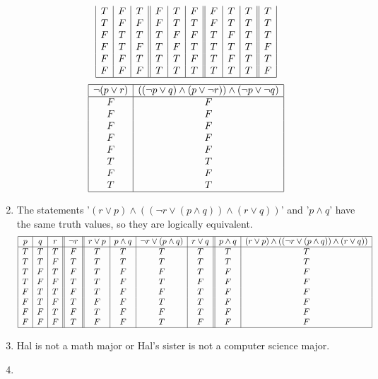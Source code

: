 \documentclass{article}
\begin{document}
\begin{enumerate}[label=\textbf{\arabic*.}]
\[\begin{array}{|c|c|c||c|c|c||c|c|c||c|c||c|}
T & F & T & F & T & F & F & T & T & T \\
T & F & F & F & T & T & F & T & T & T \\
F & T & T & T & F & F & T & F & T & T \\
F & T & F & T & F & T & T & T & T & F \\
F & F & T & T & T & F & T & F & T & T \\
F & F & F & T & T & T & T & T & T & F \\
\hline 
\end{array}
\]
\[
\begin{array}{|c|c|}
\hline
\neg (p \lor r) & ((\neg p \lor q) \land (p \lor \neg r)) \land (\neg p \lor \neg q)\\
\hline
F & F \\
F & F \\
F & F \\
F & F \\
F & F \\
T & T \\
F & F \\
T & T \\
\hline 
\end{array}
\]
\item %
The statements '$(r \lor p) \land ((\neg r \lor (p \land q )) \land (r \lor q))$' and '$p \land q$' have the same truth values, so they are logically equivalent.
\[
\begin{array}{|c|c|c||c||c|c|c|c||c|c|}
\hline
p & q & r & \neg r & r \lor p & p \land q & \neg r \lor (p \land q) & r \lor q & p \land q & (r \lor p) \land ((\neg r \lor (p \land q)) \land (r \lor q))\\
\hline
T & T & T & F & T & T & T & T & T & T \\
T & T & F & T & T & T & T & T & T & T \\
T & F & T & F & T & F & F & T & F & F \\
T & F & F & T & T & F & T & F & F & F \\
F & T & T & F & T & F & F & T & F & F \\
F & T & F & T & F & F & T & T & F & F \\
F & F & T & F & T & F & F & T & F & F \\
F & F & F & T & F & F & T & F & F & F \\
\hline 
\end{array}
\]
\item %
Hal is not a math major or Hal's sister is not a computer science major.
\item %

\end{enumerate}
\end{document}
